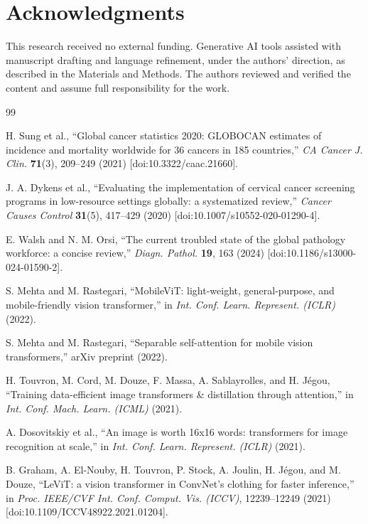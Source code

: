 \documentclass[12pt,letterpaper]{article}
\begin{document}
\section*{Acknowledgments}
This research received no external funding. Generative AI tools assisted with manuscript drafting and language refinement, under the authors' direction, as described in the Materials and Methods. The authors reviewed and verified the content and assume full responsibility for the work.

{\small
\begin{thebibliography}{99}\setlength{\itemsep}{0pt}

H. Sung et al., ``Global cancer statistics 2020: GLOBOCAN estimates of incidence and mortality worldwide for 36 cancers in 185 countries,'' \textit{CA Cancer J. Clin.} \textbf{71}(3), 209--249 (2021) [doi:10.3322/caac.21660].

J. A. Dykens et al., ``Evaluating the implementation of cervical cancer screening programs in low-resource settings globally: a systematized review,'' \textit{Cancer Causes Control} \textbf{31}(5), 417--429 (2020) [doi:10.1007/s10552-020-01290-4].

E. Walsh and N. M. Orsi, ``The current troubled state of the global pathology workforce: a concise review,'' \textit{Diagn. Pathol.} \textbf{19}, 163 (2024) [doi:10.1186/s13000-024-01590-2].

S. Mehta and M. Rastegari, ``MobileViT: light-weight, general-purpose, and mobile-friendly vision transformer,'' in \textit{Int. Conf. Learn. Represent. (ICLR)} (2022).

S. Mehta and M. Rastegari, ``Separable self-attention for mobile vision transformers,'' arXiv preprint (2022).

H. Touvron, M. Cord, M. Douze, F. Massa, A. Sablayrolles, and H. J\'egou, ``Training data-efficient image transformers \& distillation through attention,'' in \textit{Int. Conf. Mach. Learn. (ICML)} (2021).

A. Dosovitskiy et al., ``An image is worth 16x16 words: transformers for image recognition at scale,'' in \textit{Int. Conf. Learn. Represent. (ICLR)} (2021).

B. Graham, A. El-Nouby, H. Touvron, P. Stock, A. Joulin, H. J\'egou, and M. Douze, ``LeViT: a vision transformer in ConvNet's clothing for faster inference,'' in \textit{Proc. IEEE/CVF Int. Conf. Comput. Vis. (ICCV)}, 12239--12249 (2021) [doi:10.1109/ICCV48922.2021.01204].


\end{thebibliography}}
\end{document}
